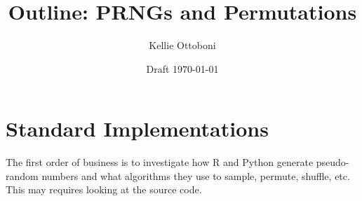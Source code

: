 \documentclass[12pt]{article}
\title{Outline: PRNGs and Permutations}
\author{Kellie Ottoboni}
\date{Draft \today}
\begin{document}
\maketitle






\section{Standard Implementations}
 The first order of business is to investigate how R and Python generate pseudo-random numbers and
what algorithms they use to sample, permute, shuffle, etc.
This may requires looking at the source code.
\end{document}
